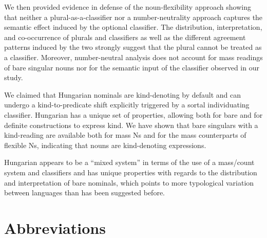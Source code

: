 \documentclass[output=paper]{langscibook}
\begin{document}
We then provided evidence in defense of the noun-flexibility approach showing that neither a plural-as-a-classifier nor a number-neutrality approach captures the semantic effect induced by the optional classifier.  The distribution, interpretation, and co-occurrence of plurals and classifiers as well as the different agreement patterns induced by the two strongly suggest that the plural cannot be treated as a classifier. Moreover, number-neutral analysis does not account for mass readings of bare singular nouns nor for the semantic input of the classifier observed in our study. 

We claimed that Hungarian nominals are kind-denoting by default and can undergo a kind-to-predicate shift \citep{chierchia-98a} explicitly triggered by a sortal individuating classifier. Hungarian has a unique set of properties, allowing both for bare and for definite constructions to express kind. We have shown that bare singulars with a kind-reading are available both for mass Ns and for the mass counterparts of flexible Ns, indicating that nouns are kind-denoting expressions. 

Hungarian appears to be a ``mixed system'' in terms of the use of a mass/count system and classifiers and has unique properties with regards to the distribution and interpretation of bare nominals, which points to more typological variation between languages than has been suggested before. 

%

\section*{Abbreviations}
\end{document}
